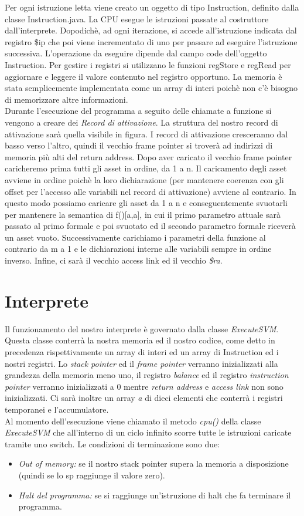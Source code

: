 \documentclass[12pt, a4paper]{report}
\begin{document}
Per ogni istruzione letta viene creato un oggetto di tipo Instruction, definito dalla classe Instruction.java. La CPU esegue le istruzioni passate al costruttore dall’interprete. Dopodichè, ad ogni iterazione, si accede all’istruzione indicata dal registro \$ip che poi viene incrementato di uno per passare ad eseguire
l’istruzione successiva. L’operazione da eseguire dipende dal campo code dell’oggetto Instruction.
Per gestire i registri si utilizzano le funzioni regStore e regRead per aggiornare e leggere il valore contenuto nel registro opportuno. La memoria è stata semplicemente implementata come un array di interi poichè non c'è bisogno di memorizzare altre informazioni.\\
Durante l'esecuzione del programma a seguito delle chiamate a funzione si vengono a creare dei \emph{Record di attivazione}. La struttura del nostro record di attivazione sarà quella visibile in figura. I record di attivazione cresceranno dal basso verso l'altro, quindi il vecchio frame pointer si troverà ad indirizzi di memoria più alti del return address. Dopo aver caricato il vecchio frame pointer caricheremo prima tutti gli asset in ordine, da 1 a n. Il caricamento degli asset avviene in ordine poichè la loro dichiarazione (per mantenere coerenza con gli offset per l'accesso alle variabili nel record di attivazione) avviene al contrario. In questo modo possiamo caricare gli asset da 1 a n e conseguentemente svuotarli per mantenere la semantica di f()[a,a], in cui il primo parametro attuale sarà passato al primo formale e poi svuotato ed il secondo parametro formale riceverà un asset vuoto.  Successivamente carichiamo i parametri della funzione al contrario da m a 1 e le dichiarazioni interne alle variabili sempre in ordine inverso. Infine, ci sarà il vecchio access link ed il vecchio \emph{\$ra}.
\section{Interprete}
Il funzionamento del nostro interprete è governato dalla classe \emph{ExecuteSVM}. Questa classe conterrà la nostra memoria ed il nostro codice, come detto in precedenza rispettivamente un array di interi ed un array di Instruction ed i nostri registri. Lo \emph{stack pointer} ed il \emph{frame pointer} verranno inizializzati alla grandezza della memoria meno uno, il registro \emph{balance} ed il registro \emph{instruction pointer} verranno inizializzati a 0 mentre \emph{return address} e \emph{access link} non sono inizializzati. Ci sarà inoltre un array \emph{a} di dieci elementi che conterrà i registri temporanei e l'accumulatore. \\
Al momento dell'esecuzione viene chiamato il metodo \emph{cpu()} della classe \emph{ExecuteSVM} che all'interno di un ciclo infinito scorre tutte le istruzioni caricate tramite uno switch. Le condizioni di terminazione sono due:
\begin{itemize}
    \item \emph{Out of memory:} se il nostro stack pointer supera la memoria a disposizione (quindi se lo sp raggiunge il valore zero).
    \item \emph{Halt del programma:} se si raggiunge un'istruzione di halt che fa terminare il programma.
\end{itemize}
\end{document}

